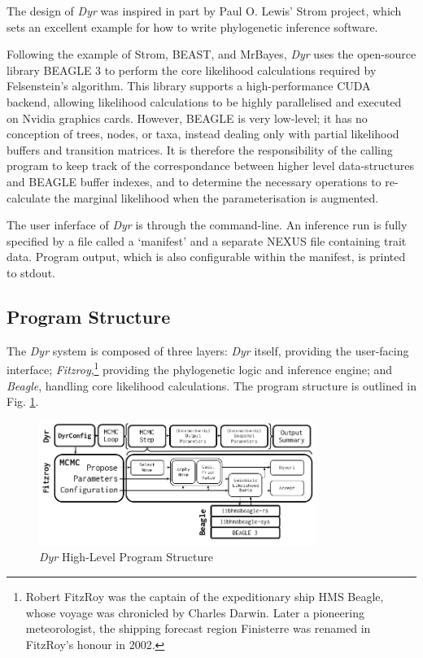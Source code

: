 \documentclass[10pt,journal,compsoc]{IEEEtran}
\begin{document}
The design of \textit{Dyr} was inspired in part by Paul O. Lewis' Strom project, which sets an excellent example for how to write phylogenetic inference software.

Following the example of Strom, BEAST, and MrBayes, \textit{Dyr} uses the open-source library BEAGLE 3 to perform the core likelihood calculations required by Felsenstein's algorithm. This library supports a high-performance CUDA backend, allowing likelihood calculations to be highly parallelised and executed on Nvidia graphics cards. However, BEAGLE is very low-level; it has no conception of trees, nodes, or taxa, instead dealing only with partial likelihood buffers and transition matrices. It is therefore the responsibility of the calling program to keep track of the correspondance between higher level data-structures and BEAGLE buffer indexes, and to determine the necessary operations to re-calculate the marginal likelihood when the parameterisation is augmented.

The user inferface of \textit{Dyr} is through the command-line. An inference run is fully specified by a file called a `manifest' and a separate NEXUS file containing trait data. Program output, which is also configurable within the manifest, is printed to stdout.

\subsection{Program Structure}

The \textit{Dyr} system is composed of three layers: \textit{Dyr} itself, providing the user-facing interface; \textit{Fitzroy},\footnote{Robert FitzRoy was the captain of the expeditionary ship HMS Beagle, whose voyage was chronicled by Charles Darwin. Later a pioneering meteorologist, the shipping forecast region Finisterre was renamed in FitzRoy's honour in 2002.} providing the phylogenetic logic and inference engine; and \textit{Beagle}, handling core likelihood calculations. The program structure is outlined in Fig. \ref{fig:program}.
\begin{figure}
\caption{\textit{Dyr} High-Level Program Structure}\label{fig:program}
\vspace{0.2cm}
\includegraphics[width=9cm,center]{progdiagram}
\end{figure}
\end{document}
